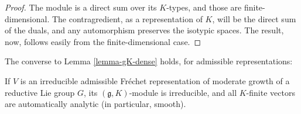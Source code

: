 \begin{proof}
 The module is a direct sum over its $K$-types, and those are finite-dimensional. The contragredient, as a representation of $K$, will be the direct sum of the duals, and any automorphism preserves the isotypic spaces. The result, now, follows easily from the finite-dimensional case.
\end{proof}

The converse to Lemma \ref{lemma-gK-dense} holds, for admissible representations: 

\begin{theorem}
 \label{theorem-irreducible-admissible}
If $V$ is an irreducible admissible Fr\'echet representation of moderate growth of a reductive Lie group $G$, its $(\mathfrak g, K)$-module is irreducible, and all $K$-finite vectors are automatically analytic (in particular, smooth).
\end{theorem}

